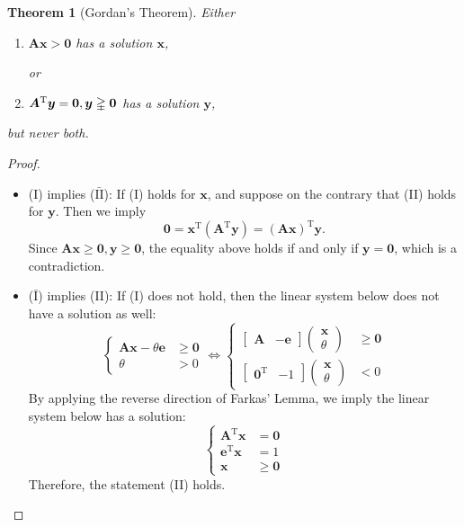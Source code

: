 \documentclass[12pt]{article}
\newcommand{\trans}{^{\mathrm T}}
\newtheorem{theorem}{Theorem}[section]
\begin{document}
\begin{theorem}[Gordan's Theorem]
Either
\begin{enumerate}
\item[(I)]
$\bm A\bm x>\bm0$ has a solution $\bm x$,

or
\item[(II)]
$\bm A\trans\bm y=\bm0,\bm y\gvertneqq\bm0$ has a solution $\bm y$,
\end{enumerate}
but never both.
\end{theorem}
\begin{proof}
\begin{itemize}
\item
(I) implies ($\bar{\text{II}}$):
If (I) holds for $\bm x$, and suppose on the contrary that (II) holds for $\bm y$. Then we imply
\[
\bm0=\bm x\trans(\bm A\trans\bm y)=(\bm A\bm x)\trans\bm y.
\]
Since $\bm{Ax}\ge\bm0,\bm y\ge\bm0$, the equality above holds if and only if $\bm y=\bm0$, which is a contradiction.
\item
($\bar{\text{I}}$) implies (II):
If (I) does not hold, then the linear system below does not have a solution as well:
\[
\left\{
\begin{aligned}
\bm A\bm x-\theta\bm e&\ge\bm0\\
\theta&>0
\end{aligned}
\right.
\Longleftrightarrow
\left\{
\begin{aligned}
\begin{bmatrix}
\bm A&-\bm e
\end{bmatrix}\begin{pmatrix}
\bm x\\\theta
\end{pmatrix}&\ge\bm0\\
\begin{bmatrix}
\bm 0\trans&-1
\end{bmatrix}\begin{pmatrix}
\bm x\\\theta
\end{pmatrix}&<0
\end{aligned}
\right.
\]
By applying the reverse direction of Farkas' Lemma, we imply the linear system below has a solution:
\[
\left\{
\begin{aligned}
\bm A\trans\bm x&=\bm0\\
\bm e\trans\bm x&=1\\
\bm x&\ge\bm0
\end{aligned}
\right.
\]
Therefore, the statement (II) holds.
\end{itemize}
\end{proof}
\end{document}
